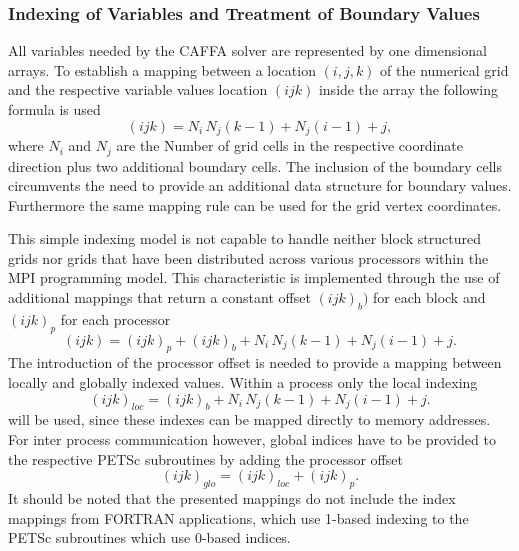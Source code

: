 \subsubsection{Indexing of Variables and Treatment of Boundary Values}

All variables needed by the CAFFA solver are represented by one dimensional arrays. To establish a mapping between a location \((i,j,k)\) of the numerical grid and the respective variable values location \((ijk)\) inside the array the following formula is used
\begin{displaymath}
  (ijk) = N_i \, N_j \left(k - 1\right) + N_j \left(i - 1\right) + j,
\end{displaymath}
where \(N_i\) and \(N_j\) are the Number of grid cells in the respective coordinate direction plus two additional boundary cells. The inclusion of the boundary cells circumvents the need to provide an additional data structure for boundary values. Furthermore the same mapping rule can be used for the grid vertex coordinates. 

This simple indexing model is not capable to handle neither block structured grids nor grids that have been distributed across various processors within the MPI programming model. This characteristic is implemented through the use of additional mappings that return a constant offset \((ijk)_b)\) for each block and \((ijk)_p\) for each processor
\begin{displaymath}
  (ijk) = (ijk)_p + (ijk)_b +  N_i \, N_j \left(k - 1\right) + N_j \left(i - 1\right) + j.
\end{displaymath}
The introduction of the processor offset is needed to provide a mapping between locally and globally indexed values. Within a process only the local indexing 
\begin{displaymath}
  (ijk)_{loc} = (ijk)_b +  N_i \, N_j \left(k - 1\right) + N_j \left(i - 1\right) + j.
\end{displaymath}
will be used, since these indexes can be mapped directly to memory addresses. For inter process communication however, global indices have to be provided to the respective PETSc subroutines by adding the processor offset
\begin{equation}
  \label{eq:globalmap}
  (ijk)_{glo} = (ijk)_{loc} + (ijk)_p.
\end{equation}
It should be noted that the presented mappings do not include the index mappings from FORTRAN applications, which use 1-based indexing to the PETSc subroutines which use 0-based indices.

